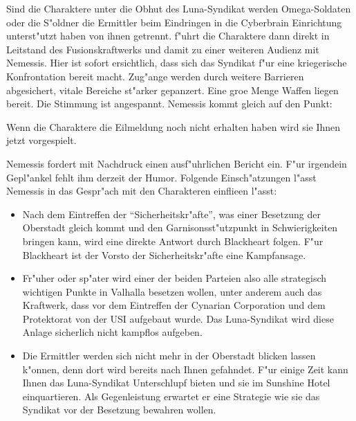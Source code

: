 Sind die Charaktere unter die Obhut des Luna-Syndikat werden Omega-Soldaten oder die S"oldner die Ermittler beim Eindringen in die Cyberbrain Einrichtung unterst"utzt haben von ihnen getrennt. \xl{} f"uhrt die Charaktere dann direkt in Leitstand des Fusionskraftwerks und damit zu einer weiteren Audienz mit Nemessis. Hier ist sofort ersichtlich, dass sich das Syndikat f"ur eine kriegerische Konfrontation bereit macht. Zug"ange werden durch weitere Barrieren abgesichert, vitale Bereiche st"arker gepanzert. Eine gro\3e Menge Waffen liegen bereit. Die Stimmung ist angespannt. Nemessis kommt gleich auf den Punkt: 


Wenn die Charaktere die Eilmeldung noch nicht erhalten haben wird sie Ihnen jetzt vorgespielt.


Nemessis fordert mit Nachdruck einen ausf"uhrlichen Bericht ein. F"ur irgendein Gepl"ankel fehlt ihm derzeit der Humor. Folgende Einsch"atzungen l"asst Nemessis in das Gespr"ach mit den Charakteren einflie\3en l"asst:

\begin{itemize}
	\item Nach dem Eintreffen der "`Sicherheitskr"afte"', was einer Besetzung der Oberstadt gleich kommt und den 			
		Garnisonsst"utzpunkt in Schwierigkeiten bringen kann, wird eine direkte Antwort durch Blackheart folgen. F"ur Blackheart ist der Vorsto\3 der Sicherheitskr"afte eine Kampfansage.
	\item Fr"uher oder sp"ater wird einer der beiden Parteien also alle strategisch wichtigen Punkte in Valhalla besetzen wollen, unter 	
		anderem auch das Kraftwerk, dass vor dem Eintreffen der Cynarian Corporation und dem Protektorat von der USI aufgebaut wurde. Das Luna-Syndikat wird diese Anlage sicherlich nicht kampflos aufgeben.
		\item Die Ermittler werden sich nicht mehr in der Oberstadt blicken lassen k"onnen, denn dort wird bereits nach Ihnen gefahndet. F"ur 
		einige Zeit kann Ihnen das Luna-Syndikat Unterschlupf bieten und sie im Sunshine Hotel einquartieren. Als Gegenleistung erwartet er eine Strategie wie sie das Syndikat vor der Besetzung bewahren wollen.			
\end{itemize}

